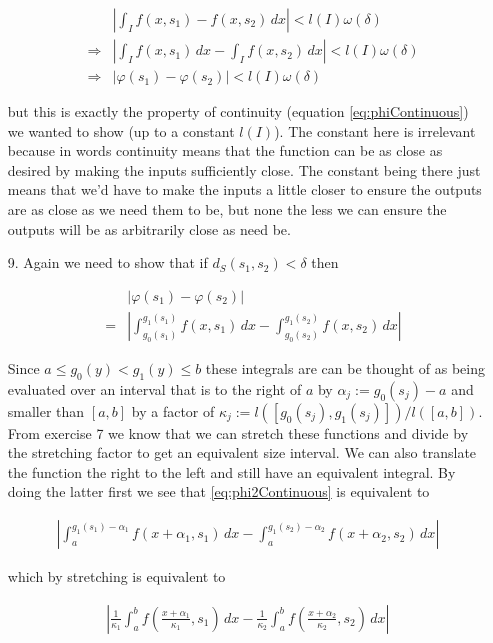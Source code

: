 \documentclass[oneside]{book}
\begin{document}
\begin{enumerate}
\begin{eqnarray}
&&\left| \int_I f(x,s_1)-f(x,s_2)\, dx \right | < l(I)\omega(\delta) \nonumber \\
&\Rightarrow& \left| \int_I f(x,s_1)\,dx- \int_I f(x,s_2)\, dx \right | < l(I)\omega(\delta) \nonumber \\
&\Rightarrow& \left| \varphi(s_1) - \varphi(s_2) \right| < l(I)\omega(\delta)
\end{eqnarray}

but this is exactly the property of continuity (equation \ref{eq:phiContinuous}) we wanted to show (up to a constant $l(I)$). The constant here is irrelevant because in words continuity means that the function can be as close as desired by making the inputs sufficiently close. The constant being there just means that we'd have to make the inputs a little closer to ensure the outputs are as close as we need them to be, but none the less we can ensure the outputs will be as arbitrarily close as need be.

\item[9.] Again we need to show that if  $d_S(s_1,s_2) < \delta$ then

\begin{eqnarray}
\label{eq:phi2Continuous}
&&\left| \varphi(s_1) - \varphi(s_2) \right| \nonumber\\
&=&\left| \int_{g_0(s_1)}^{g_1(s_1)} f(x,s_1)\, dx - \int_{g_0(s_2)}^{g_1(s_2)} f(x,s_2)\, dx \right |
\end{eqnarray}

Since $a \le g_0(y) < g_1(y) \le b$ these integrals are can be thought of as being evaluated over an interval that is to the right of $a$ by $\alpha_j := g_0(s_j)-a$ and smaller than $[a,b]$ by a factor of $\kappa_j :=l([g_0(s_j),g_1(s_j)])/l([a,b])$. From exercise 7 we know that we can stretch these functions and divide by the stretching factor to get an equivalent size interval. We can also translate the function the right to the left and still have an equivalent integral. By doing the latter first we see that \ref{eq:phi2Continuous} is equivalent to

\begin{eqnarray}
\left| \int_{a}^{g_1(s_1)-\alpha_1} f(x+\alpha_1,s_1)\, dx - \int_{a}^{g_1(s_2)-\alpha_2} f(x+\alpha_2,s_2)\, dx \right |
\end{eqnarray}

which by stretching is equivalent to

\begin{eqnarray}
\left| \frac{1}{\kappa_1} \int_{a}^{b} f\left(\frac{x+\alpha_1}{\kappa_1},s_1\right)\, dx - \frac{1}{\kappa_2} \int_{a}^{b} f\left(\frac{x+\alpha_2}{\kappa_2},s_2\right)\, dx \right|
\end{eqnarray}


\end{enumerate}
\end{document}
